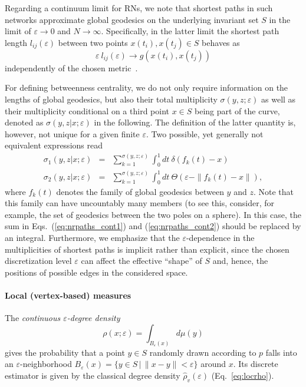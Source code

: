 Regarding a continuum limit for RNs, we note that shortest paths in such networks approximate global geodesics on the underlying invariant set $S$ in the limit of $\varepsilon\to 0$ and $N\to\infty$. Specifically, in the latter limit the shortest path length $l_{ij}(\varepsilon)$ between two points $x(t_i), x(t_j)\in S$ behaves as
\begin{equation}
\varepsilon\ l_{ij}(\varepsilon) \to g(x(t_i),x(t_j))
\end{equation}
\noindent 
independently of the chosen metric~\cite{Donges2012PRE}.

For defining betweenness centrality, we do not only require information on the lengths of global geodesics, but also their total multiplicity $\sigma(y,z;\varepsilon)$ as well as their multiplicity conditional on a third point $x\in S$ being part of the curve, denoted as $\sigma(y,z|x;\varepsilon)$ in the following. The definition of the latter quantity is, however, not unique for a given finite $\varepsilon$. Two possible, yet generally not equivalent expressions read~\cite{Donges2012PRE}
\begin{eqnarray}
\sigma_1(y,z|x;\varepsilon) &=& \sum_{k=1}^{\sigma(y,z;\varepsilon)} \int_0^1 dt\ \delta(f_k(t)-x) \label{eq:nrpaths_cont1} \\
\sigma_2(y,z|x;\varepsilon) &=& \sum_{k=1}^{\sigma(y,z;\varepsilon)} \int_0^1 dt\ \Theta(\varepsilon-\|f_k(t)-x\|), \label{eq:nrpaths_cont2}
\end{eqnarray}
\noindent
where $f_k(t)$ denotes the family of global geodesics between $y$ and $z$. Note that this family can have uncountably many members (to see this, consider, for example, the set of geodesics between the two poles on a sphere). In this case, the sum in Eqs.~(\ref{eq:nrpaths_cont1}) and (\ref{eq:nrpaths_cont2}) should be replaced by an integral. Furthermore, we emphasize that the $\varepsilon$-dependence in the multiplicities of shortest paths is implicit rather than explicit, since the chosen discretization level $\varepsilon$ can affect the effective ``shape'' of $S$ and, hence, the positions of possible edges in the considered space.


\paragraph{Local (vertex-based) measures}

The \emph{continuous $\varepsilon$-degree density}
\begin{equation}
\rho(x;\varepsilon)=\int_{B_{\varepsilon}(x)} d\mu(y)
\end{equation}
\noindent
gives the probability that a point $y\in S$ randomly drawn according to $p$ falls into an $\varepsilon$-neighborhood $B_{\varepsilon}(x)=\{y\in S\,|\, \|x-y\|<\varepsilon\}$ around $x$. Its discrete estimator is given by the classical degree density $\hat{\rho}_v(\varepsilon)$ (Eq.~\ref{eq:locrho}).

